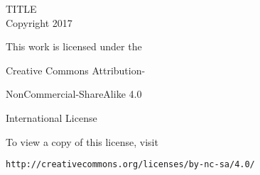\doublespaced

\vspace*{\fill}

TITLE \\

\textcopyright \hspace{10pt} Copyright 2017

\theauthor

This work is licensed under the

Creative Commons Attribution-

NonCommercial-ShareAlike 4.0

International License

To view a copy of this license, visit

{\tt http://creativecommons.org/licenses/by-nc-sa/4.0/}
\thispagestyle{empty}
